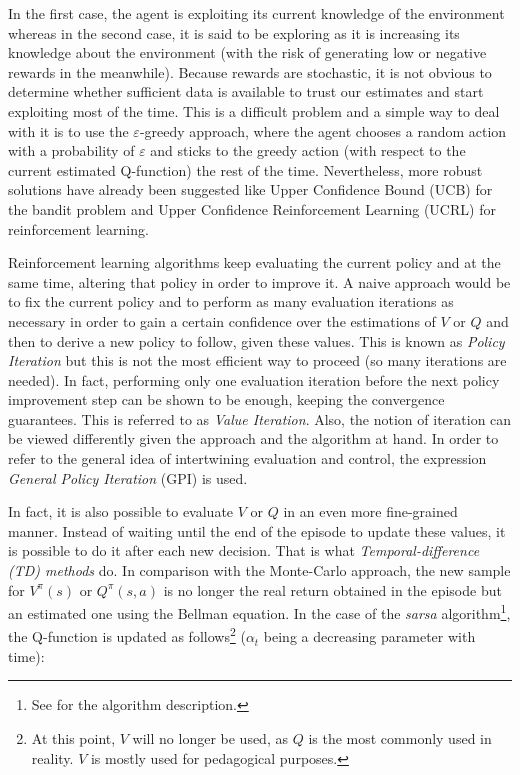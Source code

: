 			In the first case, the agent is exploiting its current knowledge of the environment whereas in the second case, it is said to be exploring as it is increasing its knowledge about the environment (with the risk of generating low or negative rewards in the meanwhile). Because rewards are stochastic, it is not obvious to determine whether sufficient data is available to trust our estimates and start exploiting most of the time. This is a difficult problem and a simple way to deal with it is to use the $\varepsilon$-greedy approach, where the agent chooses a random action with a probability of $\varepsilon$ and sticks to the greedy action (with respect to the current estimated Q-function) the rest of the time. Nevertheless, more robust solutions have already been suggested like Upper Confidence Bound (UCB) \cite{Auer2002} for the bandit problem and Upper Confidence Reinforcement Learning (UCRL) \cite{Auer2005} for reinforcement learning.
			
			Reinforcement learning algorithms keep evaluating the current policy and at the same time, altering that policy in order to improve it. A naive approach would be to fix the current policy and to perform as many evaluation iterations as necessary in order to gain a certain confidence over the estimations of $V$ or $Q$ and then to derive a new policy to follow, given these values. This is known as \textit{Policy Iteration} but this is not the most efficient way to proceed (so many iterations are needed). In fact, performing only one evaluation iteration before the next policy improvement step can be shown to be enough, keeping the convergence guarantees. This is referred to as \textit{Value Iteration}. Also, the notion of iteration can be viewed differently given the approach and the algorithm at hand. In order to refer to the general idea of intertwining evaluation and control, the expression \textit{General Policy Iteration} (GPI) is used.
			
			In fact, it is also possible to evaluate $V$ or $Q$ in an even more fine-grained manner. Instead of waiting until the end of the episode to update these values, it is possible to do it after each new decision. That is what \textit{Temporal-difference (TD) methods} do. In comparison with the Monte-Carlo approach, the new sample for $V^\pi(s)$ or $Q^\pi(s,a)$ is no longer the real return obtained in the episode but an estimated one using the Bellman equation. In the case of the \textit{sarsa} algorithm\footnote{See \cite{Sutton1998} for the algorithm description.}, the Q-function is updated as follows\footnote{At this point, $V$ will no longer be used, as $Q$ is the most commonly used in reality. $V$ is mostly used for pedagogical purposes.} ($\alpha_t$ being a decreasing parameter with time):
			
